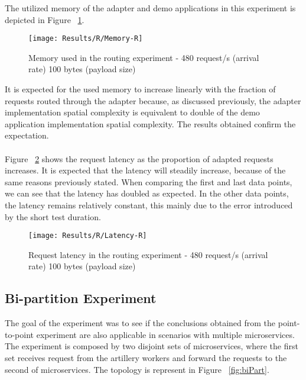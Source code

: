 The utilized memory of the adapter and demo applications in this experiment is depicted in Figure ~\ref{fig:routMem}.

\begin{figure}[htbp]
    \centering
    \texttt{[image: Results/R/Memory-R]}
    \caption{Memory used in the routing experiment - 480 request/s (arrival rate) 100 bytes (payload size)}
    \label{fig:routMem}
\end{figure}

It is expected for the used memory to increase linearly with the fraction of requests routed through the adapter because, as discussed previously,
the adapter implementation spatial complexity is equivalent to double of the demo application implementation spatial complexity.
The results obtained confirm the expectation.

\paragraph{}

Figure ~\ref{fig:routLatency} shows the request latency as the proportion of adapted requests increases.
It is expected that the latency will steadily increase, because of the same reasons previously stated.
When comparing the first and last data points, we can see that the latency has doubled as expected.
In the other data points, the latency remains relatively constant, this mainly due to the error introduced by the short test duration.

\begin{figure}[htbp]
    \centering
    \texttt{[image: Results/R/Latency-R]}
    \caption{Request latency in the routing experiment - 480 request/s (arrival rate) 100 bytes (payload size)}
    \label{fig:routLatency}
\end{figure}

\subsection{Bi-partition Experiment}

The goal of the experiment was to see if the conclusions obtained from the point-to-point experiment are also applicable in scenarios with multiple microservices.
The experiment is composed by two disjoint sets of microservices, where the first set receives request from the artillery workers and forward the requests to the second of microservices.
The topology is represent in Figure ~\ref{fig:biPart}.

